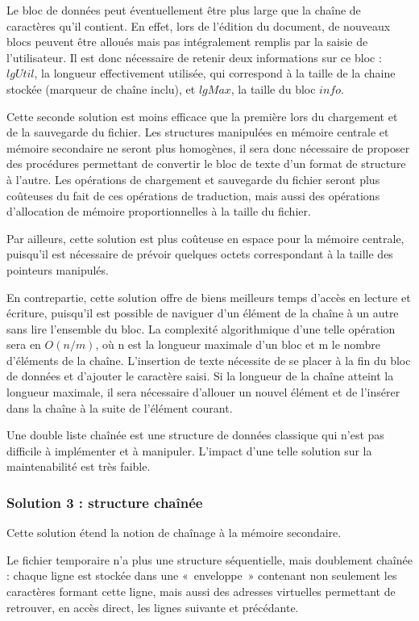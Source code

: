 Le bloc de données peut éventuellement être plus large que la chaîne de
caractères qu'il contient. En effet, lors de l'édition du document, de nouveaux
blocs peuvent être alloués mais pas intégralement remplis par la saisie de
l'utilisateur. Il est donc nécessaire de retenir deux informations sur ce bloc
: $lgUtil$, la longueur effectivement utilisée, qui correspond à la taille de
la chaine stockée (marqueur de chaîne inclu),  et $lgMax$, la taille du bloc
$info$.

Cette seconde solution est moins efficace que la première lors du chargement et
de la sauvegarde du fichier. Les structures manipulées en mémoire centrale et
mémoire secondaire ne seront plus homogènes, il sera donc nécessaire de
proposer des procédures permettant de convertir le bloc de texte d'un format de
structure à l'autre. Les opérations de chargement et sauvegarde du fichier
seront plus coûteuses du fait de ces opérations de traduction, mais aussi des
opérations d'allocation de mémoire proportionnelles à la taille du fichier.

Par ailleurs, cette solution est plus coûteuse en espace pour la mémoire
centrale, puisqu'il est nécessaire de prévoir quelques octets correspondant à
la taille des pointeurs manipulés.

En contrepartie, cette solution offre de biens meilleurs temps d'accès en
lecture et écriture, puisqu'il est possible de naviguer d'un élément de la
chaîne à un autre sans lire l'ensemble du bloc. La complexité algorithmique
d'une telle opération sera en $O(n/m)$, où n est la longueur maximale d'un bloc
et m le nombre d'éléments de la chaîne. L'insertion de texte nécessite de se
placer à la fin du bloc de données et d'ajouter le caractère saisi. Si la
longueur de la chaîne atteint la longueur maximale, il sera nécessaire
d'allouer un nouvel élément et de l'insérer dans la chaîne à la suite de
l'élément courant.

Une double liste chaînée est une structure de données classique qui n'est pas
difficile à implémenter et à manipuler. L'impact d'une telle solution sur la
maintenabilité est très faible.

\subsubsection{Solution 3 : structure chaînée}
Cette solution étend la notion de chaînage à la mémoire secondaire.

Le fichier temporaire n'a plus une structure séquentielle, mais doublement chaînée : chaque ligne est stockée dans une «~enveloppe~» contenant non seulement les caractères formant cette ligne, mais aussi des adresses virtuelles permettant de retrouver, en accès direct, les lignes suivante et précédante.

